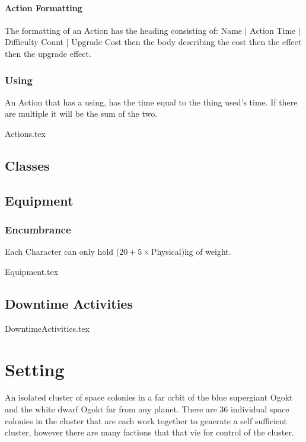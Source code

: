 \documentclass[a4paper,12pt,oneside]{book}
\begin{document}
            \subsubsection{Action Formatting}
                The formatting of an Action has the heading consisting of: Name $\vert$ Action Time $\vert$ Difficulty Count $\vert$ Upgrade Cost then the body describing the cost then the effect then the upgrade effect.

            \subsection{Using}
                An Action that has a using, has the time equal to the thing used's time. If there are multiple it will be the sum of the two.

            {Actions.tex}
                
        \section{Classes}
        \section{Equipment}
            \subsection{Encumbrance}
                Each Character can only hold ($20 + 5\times$Physical)kg of weight.

            {Equipment.tex}
        \section{Downtime Activities}
            {DowntimeActivities.tex}

    \chapter{Setting}
        An isolated cluster of space colonies in a far orbit of the blue supergiant \alpha Ogokt and the white dwarf \beta Ogokt far from any planet. There are 36 individual space colonies in the cluster that are each work together to generate a self sufficient cluster, however there are many factions that that vie for control of the cluster.
\end{document}
